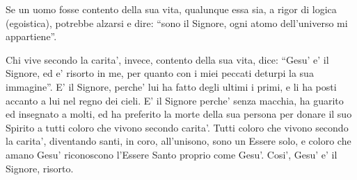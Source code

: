\begin{vcentered}
    Se un uomo fosse contento della sua vita, qualunque essa sia, a rigor di logica (egoistica), potrebbe alzarsi e dire: ``sono il Signore, ogni atomo dell'universo mi appartiene''. 

    Chi vive secondo la carita', invece, contento della sua vita, dice: ``Gesu' e' il Signore, ed e' risorto in me, per quanto con i miei peccati deturpi la sua immagine''. E' il Signore, perche' lui ha fatto degli ultimi i primi, e li ha posti accanto a lui nel regno dei cieli. E' il Signore perche' senza macchia, ha guarito ed insegnato a molti, ed ha preferito la morte della sua persona per donare il suo Spirito a tutti coloro che vivono secondo carita'. Tutti coloro che vivono secondo la carita', diventando santi, in coro, all'unisono, sono un Essere solo, e coloro che amano Gesu' riconoscono l'Essere Santo proprio come Gesu'. Cosi', Gesu' e' il Signore, risorto.
\end{vcentered}


